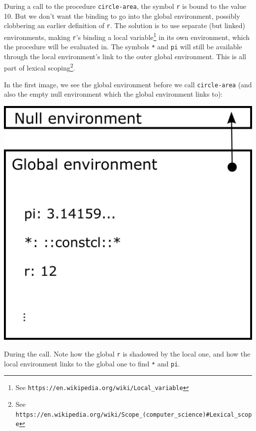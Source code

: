 \documentclass[twoside,9pt]{report}
\begin{document}
During a call to the procedure \texttt{circle-area}, the symbol \texttt{r} is bound to the value 10. But we don't want the binding to go into the global environment, possibly clobbering an earlier definition of \texttt{r}. The solution is to use separate (but linked) environments, making \texttt{r}'s binding a local variable\footnote{See \texttt{https://en.wikipedia.org/wiki/Local\_variable}} in its own environment, which the procedure will be evaluated in. The symbols \texttt{*} and \texttt{pi} will still be available through the local environment's link to the outer global environment. This is all part of lexical scoping\footnote{See \texttt{https://en.wikipedia.org/wiki/Scope\_(computer\_science)\#Lexical\_scope}}.


In the first image, we see the global environment before we call \texttt{circle-area} (and also the empty null environment which the global environment links to):

\includegraphics{images/env1.png}

During the call. Note how the global \texttt{r} is shadowed by the local one, and how the local environment links to the global one to find \texttt{*} and \texttt{pi}.
\end{document}
